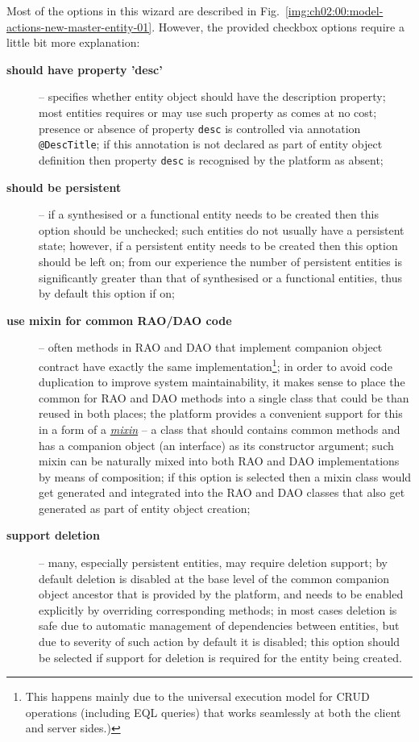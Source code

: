   Most of the options in this wizard are described in Fig.~\ref{img:ch02:00:model-actions-new-master-entity-01}.
  However, the provided checkbox options require a little bit more explanation:
  \begin{description}
   \item[\textbf{should have property 'desc'}] -- 
   specifies whether entity object should have the description property; most entities requires or may use such property as comes at no cost; 
   presence or absence of property \texttt{desc} is controlled via annotation \texttt{@DescTitle}; 
   if this annotation is not declared as part of entity object definition then property \texttt{desc} is recognised by the platform as absent;

   \item[\textbf{should be persistent}] -- 
   if a synthesised or a functional entity needs to be created then this option should be unchecked; such entities do not usually have a persistent state; 
   however, if a persistent entity needs to be created then this option should be left on; from our experience the number of persistent entities is significantly greater than that of synthesised or a functional entities, thus by default this option if on;

   \item[\textbf{use mixin for common RAO/DAO code}] -- 
   often methods in RAO and DAO that implement companion object contract have exactly the same implementation\footnote{This happens mainly due to the universal execution model for CRUD operations (including EQL queries) that works seamlessly at both the client and server sides.)}; 
   in order to avoid code duplication to improve system maintainability, it makes sense to place the common for RAO and DAO methods into a single class that could be than reused in both places; 
   the platform provides a convenient support for this in a form of a \emph{\href{http://en.wikipedia.org/wiki/Mixin}{mixin}} -- a class that should contains common methods and has a companion object (an interface) as its constructor argument; such mixin can be naturally mixed into both RAO and DAO implementations by means of composition; 
   if this option is selected then a mixin class would get generated and integrated into the RAO and DAO classes that also get generated as part of entity object creation;

   \item[\textbf{support deletion}] -- 
   many, especially persistent entities, may require deletion support; 
   by default deletion is disabled at the base level of the common companion object ancestor that is provided by the platform, and needs to be enabled explicitly by overriding corresponding methods; 
   in most cases deletion is safe due to automatic management of dependencies between entities, but due to severity of such action by default it is disabled; 
   this option should be selected if support for deletion is required for the entity being created.
  \end{description}
 
